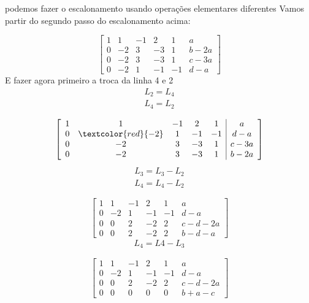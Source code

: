 \documentclass{beamer}
\begin{document}
\begin{frame}{podemos fazer o escalonamento usando operações elementares diferentes}
  Vamos partir do segundo passo do escalonamento acima:

  $$
  \left[ \begin{array}{ccccc|c}
     1 & 1 & -1 & 2 & 1 & a \\ 
      0 & -2 & 3 &-3 & 1 & b-2a \\
     0 & -2 & 3 & -3 & 1 & c-3a \\
     0 & -2 & 1 & -1 & -1 & d -a
     \end{array}\right]
 $$
 E fazer agora primeiro a troca da linha 4 e 2 
 \begin{gather*}  
  L_2 = L_4 \\
  L_4 = L_2
\end{gather*}

\end{frame}
$$
\left[ \begin{array}{ccccc|c}
   1 & 1 & -1 & 2 & 1 & a \\ 
   0 & \textcolor{red}{-2} & 1 & -1 & -1 & d -a\\
  0 & -2 & 3 & -3 & 1 & c-3a \\
   0 & -2 & 3 &-3 & 1 & b-2a 
\end{array}\right]
$$
\begin{gather*}
  L_3 = L_3 - L_2 \\
  L_4 = L_4 -L_2
\end{gather*}

\begin{frame}
   
  $$
  \left[ \begin{array}{ccccc|c}
     1 & 1 & -1 & 2 & 1 & a \\ 
     0 & -2 & 1 & -1 & -1 & d -a\\
    0 & 0 & 2 & -2 & 2 & c -d-2a \\
     0 & 0 & 2 &-2 & 2 & b-d -a 
  \end{array}\right]
  $$
  \begin{gather*}
    L_4=L4-L_3
  \end{gather*}


\end{frame}



\begin{frame}{ }
  $$
  \left[ \begin{array}{ccccc|c}
     1 & 1 & -1 & 2 & 1 & a \\ 
     0 & -2 & 1 & -1 & -1 & d -a\\
    0 & 0 & 2 & -2 & 2 & c -d-2a \\
     0 & 0 & 0 &0 & 0 & b +a -c 
  \end{array}\right]
  $$
\end{frame}
\end{document}
